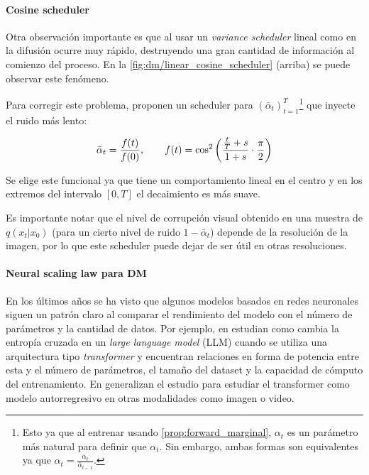 \paragraph{Cosine scheduler}

Otra observación importante es que al usar un \textit{variance scheduler} lineal como en \cite{ho2020denoising} la difusión ocurre muy rápido, destruyendo una gran cantidad de información al comienzo del proceso. En la \autoref{fig:dm/linear_cosine_scheduler} (arriba) se puede observar este fenómeno.


Para corregir este problema, proponen un scheduler para $(\bar\alpha_t)_{t=1}^T$\footnote{Esto ya que al entrenar usando \eqref{prop:forward_marginal}, $\alpha_t$ es un parámetro más natural para definir que $\alpha_t$. Sin embargo, ambas formas son equivalentes ya que $\alpha_t=\frac{\bar\alpha_t}{\bar\alpha_{t-1}}$.} que inyecte el ruido más lento:

\begin{equation}
    \bar\alpha_t = \frac{f(t)}{f(0)},\qquad f(t)=\cos^2\left(\frac{\frac{t}{T}+s}{1+s}\cdot\frac{\pi}{2}\right)
\end{equation}

Se elige este funcional ya que tiene un comportamiento lineal en el centro y en los extremos del intervalo $[0,T]$ el decaimiento es más suave.

Es importante notar que el nivel de corrupción visual obtenido en una muestra de $q(x_t|x_0)$ (para un cierto nivel de ruido $1-\bar\alpha_t$) depende de la resolución de la imagen, por lo que este scheduler puede dejar de ser útil en otras resoluciones.

\paragraph{Neural scaling law para DM}

En los últimos años se ha visto que algunos modelos basados en redes neuronales siguen un patrón claro al comparar el rendimiento del modelo con el número de parámetros y la cantidad de datos. Por ejemplo, en \cite{kaplan2020scaling} estudian como cambia la entropía cruzada en un \textit{large language model} (LLM) cuando se utiliza una arquitectura tipo \textit{transformer} y encuentran relaciones en forma de potencia entre esta y el número de parámetros, el tamaño del dataset y la capacidad de cómputo del entrenamiento. En \cite{farhani2022momentum} generalizan el estudio para estudiar el transformer como modelo autorregresivo en otras modalidades como imagen o video.

